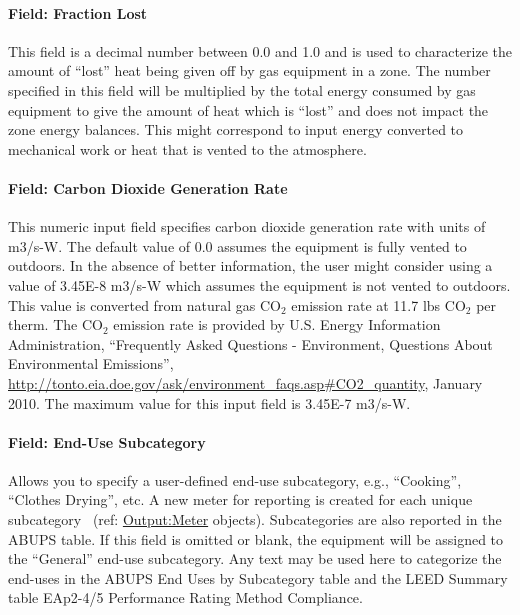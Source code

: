 \paragraph{Field: Fraction Lost}\label{field-fraction-lost-1}

This field is a decimal number between 0.0 and 1.0 and is used to characterize the amount of ``lost'' heat being given off by gas equipment in a zone. The number specified in this field will be multiplied by the total energy consumed by gas equipment to give the amount of heat which is ``lost'' and does not impact the zone energy balances. This might correspond to input energy converted to mechanical work or heat that is vented to the atmosphere.

\paragraph{Field: Carbon Dioxide Generation Rate}\label{field-carbon-dioxide-generation-rate-1}

This numeric input field specifies carbon dioxide generation rate with units of m3/s-W. The default value of 0.0 assumes the equipment is fully vented to outdoors. In the absence of better information, the user might consider using a value of 3.45E-8 m3/s-W which assumes the equipment is not vented to outdoors. This value is converted from natural gas CO\(_{2}\) emission rate at 11.7 lbs CO\(_{2}\) per therm. The CO\(_{2}\) emission rate is provided by U.S. Energy Information Administration, ``Frequently Asked Questions - Environment, Questions About Environmental Emissions'', \url{http://tonto.eia.doe.gov/ask/environment_faqs.asp#CO2_quantity}, January 2010. The maximum value for this input field is 3.45E-7 m3/s-W.

\paragraph{Field: End-Use Subcategory}\label{field-end-use-subcategory-2-001}

Allows you to specify a user-defined end-use subcategory, e.g., ``Cooking'', ``Clothes Drying'', etc. A new meter for reporting is created for each unique subcategory~ (ref: \hyperref[outputmeter-and-outputmetermeterfileonly]{Output:Meter} objects). Subcategories are also reported in the ABUPS table. If this field is omitted or blank, the equipment will be assigned to the ``General'' end-use subcategory. Any text may be used here to categorize the end-uses in the ABUPS End Uses by Subcategory table and the LEED Summary table EAp2-4/5 Performance Rating Method Compliance.

